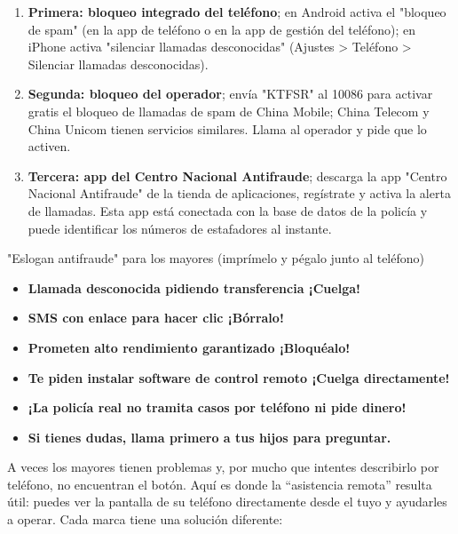 
\begin{enumerate}
  \item \textbf{Primera: bloqueo integrado del teléfono}; en Android activa el "bloqueo de spam" (en la app de teléfono o en la app de gestión del teléfono); en iPhone activa "silenciar llamadas desconocidas" (Ajustes > Teléfono > Silenciar llamadas desconocidas).
  \item \textbf{Segunda: bloqueo del operador}; envía "KTFSR" al 10086 para activar gratis el bloqueo de llamadas de spam de China Mobile; China Telecom y China Unicom tienen servicios similares. Llama al operador y pide que lo activen.
  \item \textbf{Tercera: app del Centro Nacional Antifraude}; descarga la app "Centro Nacional Antifraude" de la tienda de aplicaciones, regístrate y activa la alerta de llamadas. Esta app está conectada con la base de datos de la policía y puede identificar los números de estafadores al instante.
\end{enumerate}

\begin{tcbwarn}{"Eslogan antifraude" para los mayores (imprímelo y pégalo junto al teléfono)}
\begin{itemize}
  \item \textbf{Llamada desconocida pidiendo transferencia ¡Cuelga!}
  \item \textbf{SMS con enlace para hacer clic ¡Bórralo!}
  \item \textbf{Prometen alto rendimiento garantizado ¡Bloquéalo!}
  \item \textbf{Te piden instalar software de control remoto ¡Cuelga directamente!}
  \item \textbf{¡La policía real no tramita casos por teléfono ni pide dinero!}
  \item \textbf{Si tienes dudas, llama primero a tus hijos para preguntar.}
\end{itemize}

\end{tcbwarn}


A veces los mayores tienen problemas y, por mucho que intentes describirlo por teléfono, no encuentran el botón. Aquí es donde la “asistencia remota” resulta útil: puedes ver la pantalla de su teléfono directamente desde el tuyo y ayudarles a operar. Cada marca tiene una solución diferente:

